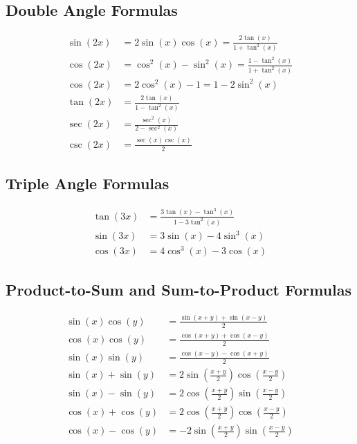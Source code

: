 \documentclass{article}
\begin{document}
\subsection{Double Angle Formulas}

\begin{align}
\sin(2x) &= 2\sin(x)\cos(x) = \frac{2\tan(x)}{1+\tan^2(x)} \\
\cos(2x) &= \cos^2(x) - \sin^2(x) = \frac{1-\tan^2(x)}{1+\tan^2(x)} \\
\cos(2x) &= 2\cos^2(x) - 1 = 1 - 2\sin^2(x) \\
\tan(2x) &= \frac{2\tan(x)}{1-\tan^2(x)} \\
\sec(2x) &= \frac{\sec^2(x)}{2-\sec^2(x)} \\
\csc(2x) &= \frac{\sec(x)\csc(x)}{2}
\end{align}

\subsection{Triple Angle Formulas}

\begin{align}
\tan(3x) &= \frac{3\tan(x)-\tan^3(x)}{1-3\tan^2(x)} \\
\sin(3x) &= 3\sin(x)-4\sin^3(x) \\
\cos(3x) &= 4\cos^3(x)-3\cos(x)
\end{align}

\subsection{Product-to-Sum and Sum-to-Product Formulas}

\begin{align}
\sin(x)\cos(y) &= \frac{\sin(x+y) + \sin(x-y)}{2} \\
\cos(x)\cos(y) &= \frac{\cos(x+y) + \cos(x-y)}{2} \\
\sin(x)\sin(y) &= \frac{\cos(x-y) - \cos(x+y)}{2} \\
\sin(x)+\sin(y) &= 2\sin\left(\frac{x+y}{2}\right)\cos\left(\frac{x-y}{2}\right) \\
\sin(x)-\sin(y) &= 2\cos\left(\frac{x+y}{2}\right)\sin\left(\frac{x-y}{2}\right) \\
\cos(x)+\cos(y) &= 2\cos\left(\frac{x+y}{2}\right)\cos\left(\frac{x-y}{2}\right) \\
\cos(x)-\cos(y) &= -2\sin\left(\frac{x+y}{2}\right)\sin\left(\frac{x-y}{2}\right)
\end{align}
\end{document}
